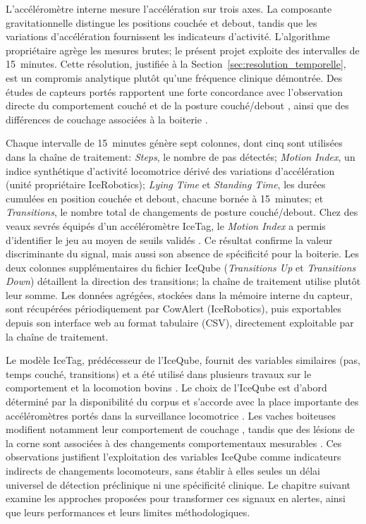 L'accéléromètre interne mesure l'accélération sur trois axes. La composante gravitationnelle
distingue les positions couchée et debout, tandis que les variations d'accélération fournissent
les indicateurs d'activité. L'algorithme propriétaire agrège les mesures brutes; le présent
projet exploite des intervalles de 15~minutes. Cette résolution, justifiée à la
Section~\ref{sec:resolution_temporelle}, est un compromis analytique plutôt qu'une fréquence
clinique démontrée. Des études de capteurs portés rapportent une forte concordance avec
l'observation directe du comportement couché et de la posture couché/debout
\citep{ledgerwood2010lying,alsaaod2012electronic}, ainsi que des différences de couchage
associées à la boiterie \citep{blackie2011lying}.

Chaque intervalle de 15~minutes génère sept colonnes, dont cinq sont utilisées dans la chaîne de
traitement: \textit{Steps}, le nombre de pas détectés; \textit{Motion Index}, un indice
synthétique d'activité locomotrice dérivé des variations d'accélération (unité propriétaire
IceRobotics); \textit{Lying Time} et \textit{Standing Time}, les durées cumulées en position
couchée et debout, chacune bornée à 15~minutes; et \textit{Transitions}, le nombre total de
changements de posture couché/debout.
Chez des veaux sevrés équipés d'un accéléromètre IceTag, le \textit{Motion Index} a permis
d'identifier le jeu au moyen de seuils validés \citep{mckay2024play}. Ce résultat confirme
la valeur discriminante du signal, mais aussi son absence de spécificité pour la boiterie.
Les deux colonnes supplémentaires du fichier IceQube (\textit{Transitions Up} et
\textit{Transitions Down}) détaillent la direction des transitions; la chaîne de traitement
utilise plutôt leur somme.
Les données agrégées, stockées dans la mémoire interne du capteur, sont récupérées périodiquement
par CowAlert (IceRobotics), puis exportables depuis son interface web au format tabulaire (CSV),
directement exploitable par la chaîne de traitement.

Le modèle IceTag, prédécesseur de l'IceQube, fournit des variables similaires (pas, temps
couché, transitions) et a été utilisé dans plusieurs travaux sur le comportement et la
locomotion bovins \citep{beer2016objective,alsaaod2012electronic}. Le choix de l'IceQube
est d'abord déterminé par la disponibilité du corpus et s'accorde avec la place importante
des accéléromètres portés dans la surveillance locomotrice
\citep{oleary2020accelerometers,bewley2015precision}. Les vaches boiteuses modifient notamment
leur comportement de couchage \citep{ito2010lying}, tandis que des lésions de la corne sont
associées à des changements comportementaux mesurables \citep{nechanitzky2016analysis}.
Ces observations justifient l'exploitation des variables IceQube comme indicateurs indirects
de changements locomoteurs, sans établir à elles seules un délai universel de détection
préclinique ni une spécificité clinique. Le chapitre suivant examine les approches proposées
pour transformer ces signaux en alertes, ainsi que leurs performances et leurs limites
méthodologiques.

